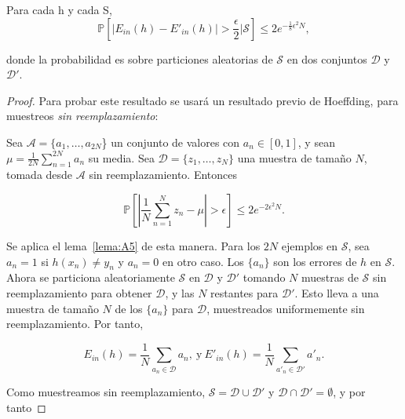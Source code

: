 \begin{lema}
\label{lema:A4}
  Para cada h y cada S,
   \begin{displaymath}
       \mathbb{P} \left[| E_{in}(h) - E'_{in}(h) | > \frac{\epsilon}{2} \Big\vert \mathcal{S} \right] \leq 2e^{- \frac{1}{8} \epsilon^2 N},
   \end{displaymath}

   donde la probabilidad es sobre particiones aleatorias de $\mathcal{S}$
   en dos conjuntos $\mathcal{D}$ y $\mathcal{D}'$.

   \begin{proof}
      Para probar este resultado se usará un resultado previo de Hoeffding, para
      muestreos \emph{sin reemplazamiento}:
      \begin{lema}[Hoeffding, 1963]
      \label{lema:A5}
        Sea $\mathcal{A} = \{a_1,\ldots, a_{2N}$\} un conjunto de valores con
        $a_n \in [0,1]$, y sean $\mu = \frac{1}{2N} \sum_{n=1}^{2N} a_n$ su
        media. Sea $\mathcal{D} = \{z_1,\ldots, z_N\}$ una muestra de tamaño
        $N$, tomada desde $\mathcal{A}$ sin reemplazamiento. Entonces

        \begin{displaymath}
         \mathbb{P} \left[ \left| \frac{1}{N} \sum_{n=1}^N z_n - \mu \right| > \epsilon \right] \leq 2e^{-2 \epsilon^2 N}.
        \end{displaymath}
      \end{lema}

      Se aplica el lema~\ref{lema:A5} de esta manera. Para los $2N$ ejemplos en
      $\mathcal{S}$, sea $a_n = 1$ si $h(x_n) \neq y_n$ y $a_n = 0$ en otro caso.
      Los $\{a_n\}$ son los errores de $h$ en $\mathcal{S}$. Ahora se particiona
      aleatoriamente $\mathcal{S}$ en $\mathcal{D}$ y $\mathcal{D}'$ tomando $N$
      muestras de $\mathcal{S}$ sin reemplazamiento para obtener $\mathcal{D}$,
      y las $N$ restantes para $\mathcal{D}'$. Esto lleva a una muestra de tamaño
      $N$ de los $\{a_n\}$ para $\mathcal{D}$, muestreados uniformemente
      sin reemplazamiento. Por tanto,

      \begin{displaymath}
          E_{in}(h) = \frac{1}{N} \sum_{a_n \in \mathcal{D}} a_n, \ \text{y} \ E'_{in}(h) = \frac{1}{N} \sum_{a'_n \in \mathcal{D}'} a'_n.
      \end{displaymath}

     Como muestreamos sin reemplazamiento, $\mathcal{S} = \mathcal{D} \cup \mathcal{D}'$
     y $\mathcal{D} \cap \mathcal{D}' = \emptyset$, y por tanto


\end{proof}
\end{lema}
